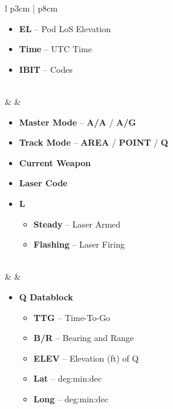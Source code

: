 \documentclass[8pt,usenames,dvipsnames,twoside]{article}
\begin{document}
\begin{center}
\begin{longtable}{l p{3cm} | p{8cm}}
\begin{minipage}[t]{\linewidth}
\begin{itemize}
\begin{itemize}
							\item \textbf{EL} -- Pod LoS Elevation
							\item \textbf{Time} -- UTC Time
							\item \textbf{IBIT} -- Codes
						\end{itemize}
					\end{itemize}
				\end{minipage} \\
				\midrule
				\textbullet &  & 
				\begin{minipage}[t]{\linewidth}
					\vspace{-7pt}
					\begin{itemize}
						\item \textbf{Master Mode} -- \textbf{A/A} / \textbf{A/G}
						\item \textbf{Track Mode} -- \textbf{AREA} / \textbf{POINT} / \textbf{Q}
						\item \textbf{Current Weapon}
						\item \textbf{Laser Code}
						\item \textbf{L}
						\begin{itemize}
							\item \textbf{Steady} -- Laser Armed
							\item \textbf{Flashing} -- Laser Firing
						\end{itemize}
					\end{itemize}
				\end{minipage} \\
				\midrule
				\textbullet &  &
				\begin{minipage}[t]{\linewidth}
					\vspace{-7pt}
					\begin{itemize}
						\item \textbf{Q Datablock}
						\begin{itemize}
							\item \textbf{TTG} -- Time-To-Go
							\item \textbf{B/R} -- Bearing and Range
							\item \textbf{ELEV} -- Elevation (ft) of Q
							\item \textbf{Lat} -- deg:min:dec
							\item \textbf{Long} -- deg:min:dec
						\end{itemize}
					\end{itemize}
				\end{minipage} \\

\end{longtable}
\end{center}
\end{document}
